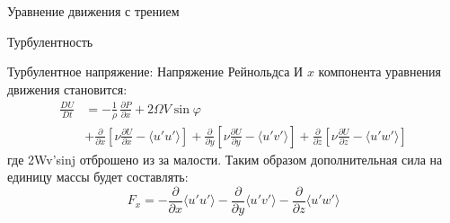 \begin{chapter}{Уравнение движения с трением}
\begin{section}{Турбулентность}
\begin{paragraph}{Турбулентное напряжение: Напряжение Рейнольдса}
И $x$ компонента уравнения движения становится:
\begin{equation}
\begin{split}
\frac{DU}{Dt} & = -\frac{1}{\rho}\,\frac{\partial{P}}{\partial{x}}  + 2\Omega V\sin\varphi \\
  & + \frac{\partial }{\partial x} \left[ \nu \frac{\partial U}{\partial x} - \langle u'u'\rangle \right]
    + \frac{\partial }{\partial y} \left[ \nu \frac{\partial U}{\partial y} - \langle u'v'\rangle \right] +
      \frac{\partial }{\partial z} \left[ \nu \frac{\partial U}{\partial z} - \langle u'w'\rangle \right]
\end{split}
\end{equation}
где 2Wv'sinj отброшено из за малости. Таким образом дополнительная
сила на единицу массы будет составлять:
\begin{equation}
F_x=-\frac{\partial}{\partial{x}}\langle u'u' \rangle
-\frac{\partial}{\partial{y}}\langle u'v' \rangle
-\frac{\partial}{\partial{z}}\langle u'w'\rangle
\end{equation}
%


\end{paragraph}
\end{section}
\end{chapter}
